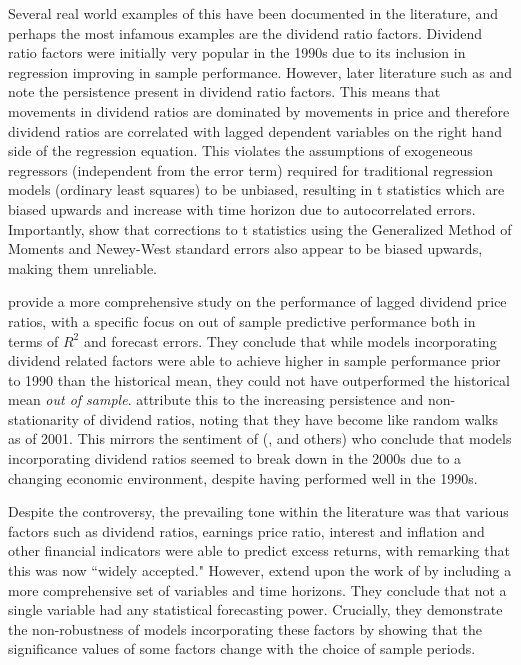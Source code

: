 \documentclass[11pt, a4paper, table]{article}
\begin{document}
Several real world examples of this have been documented in the literature, and perhaps the most infamous examples are the dividend ratio factors. Dividend ratio factors were initially very popular in the 1990s due to its inclusion in regression improving in sample performance. However, later literature such as \cite{goetzmann_testing_1993} and \cite{ang_stock_2006} note the persistence present in dividend ratio factors. This means that movements in dividend ratios are dominated by movements in price and therefore dividend ratios are correlated with lagged dependent variables on the right hand side of the regression equation. This violates the assumptions of exogeneous regressors (independent from the error term) required for traditional regression models (ordinary least squares) to be unbiased, resulting in t statistics which are biased upwards and increase with time horizon due to autocorrelated errors. Importantly, \cite{goetzmann_testing_1993} show that corrections to t statistics using the Generalized Method of Moments and Newey-West standard errors also appear to be biased upwards, making them unreliable. 

\cite{goyal_predicting_2003} provide a more comprehensive study on the performance of lagged dividend price ratios, with a specific focus on out of sample predictive performance both in terms of $R^2$ and forecast errors. They conclude that while models incorporating dividend related factors were able to achieve higher in sample performance prior to 1990 than the historical mean, they could not have outperformed the historical mean \textit{out of sample}. \cite{goyal_predicting_2003} attribute this to the increasing persistence and non-stationarity of dividend ratios, noting that they have become like random walks as of 2001. This mirrors the sentiment of (\cite{lettau_consumption_2001}, \cite{schwert_anomalies_2003} and others) who conclude that models incorporating dividend ratios seemed to break down in the 2000s due to a changing economic environment, despite having performed well in the 1990s.

Despite the controversy, the prevailing tone within the literature was that various factors such as dividend ratios, earnings price ratio, interest and inflation and other financial indicators were able to predict excess returns, with \cite{lettau_consumption_2001} remarking that this was now ``widely accepted." However, \cite{welch_comprehensive_2008} extend upon the work of \cite{goyal_predicting_2003} by including a more comprehensive set of variables and time horizons. They conclude that not a single variable had any statistical forecasting power. Crucially, they demonstrate the non-robustness of models incorporating these factors by showing that the significance values of some factors change with the choice of sample periods.
\end{document}
